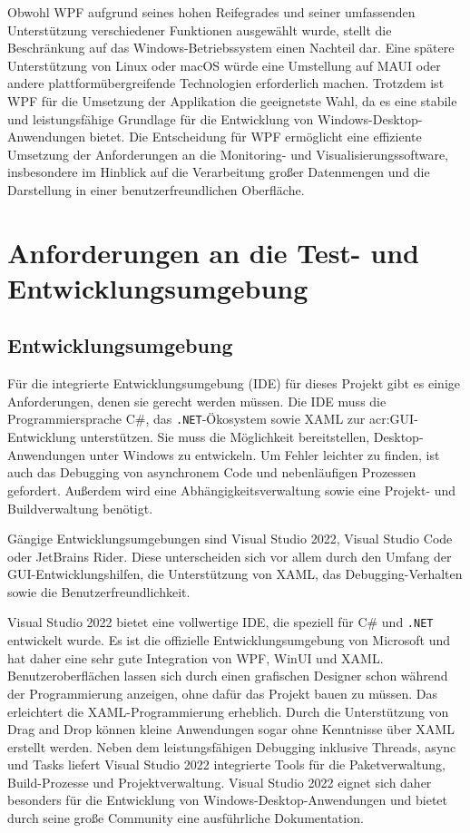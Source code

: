         Obwohl WPF aufgrund seines hohen Reifegrades und seiner umfassenden Unterstützung verschiedener Funktionen ausgewählt wurde, stellt die Beschränkung auf das Windows-Betriebssystem einen Nachteil dar. Eine spätere Unterstützung von Linux oder macOS würde eine Umstellung auf MAUI oder andere plattformübergreifende Technologien erforderlich machen. Trotzdem ist WPF für die Umsetzung der Applikation die geeignetste Wahl, da es eine stabile und leistungsfähige Grundlage für die Entwicklung von Windows-Desktop-Anwendungen bietet. Die Entscheidung für WPF ermöglicht eine effiziente Umsetzung der Anforderungen an die Monitoring- und Visualisierungssoftware, insbesondere im Hinblick auf die Verarbeitung großer Datenmengen und die Darstellung in einer benutzerfreundlichen Oberfläche.
        
\section{Anforderungen an die Test- und Entwicklungsumgebung}
    \subsection{Entwicklungsumgebung}
        Für die integrierte Entwicklungsumgebung (IDE) für dieses Projekt gibt es einige Anforderungen, denen sie gerecht werden müssen. 
        Die IDE muss die Programmiersprache C\#, das \texttt{.NET}-Ökosystem sowie XAML zur \acrshort{acr:GUI}-Entwicklung unterstützen.
        Sie muss die Möglichkeit bereitstellen, Desktop-Anwendungen unter Windows zu entwickeln. 
        Um Fehler leichter zu finden, ist auch das Debugging von asynchronem Code und nebenläufigen Prozessen gefordert.
        Außerdem wird eine Abhängigkeitsverwaltung sowie eine Projekt- und Buildverwaltung benötigt.
        
        Gängige Entwicklungsumgebungen sind Visual Studio 2022, Visual Studio Code oder JetBrains Rider. Diese unterscheiden sich vor allem durch den Umfang der GUI-Entwicklungshilfen, die Unterstützung von XAML, das Debugging-Verhalten sowie die Benutzerfreundlichkeit. \autocite{mikejo5000WasIstVisual} \autocite{RiderCrossplatformNET} \autocite{Working}

        Visual Studio 2022 bietet eine vollwertige IDE, die speziell für C\# und \texttt{.NET} entwickelt wurde. 
        Es ist die offizielle Entwicklungsumgebung von Microsoft und hat daher eine sehr gute Integration von WPF, WinUI und XAML. 
        Benutzeroberflächen lassen sich durch einen grafischen Designer schon während der Programmierung anzeigen, ohne dafür das Projekt bauen zu müssen.
        Das erleichtert die XAML-Programmierung erheblich. Durch die Unterstützung von Drag and Drop 
        können kleine Anwendungen sogar ohne Kenntnisse über XAML erstellt werden. Neben dem leistungsfähigen Debugging inklusive Threads, async und Tasks liefert Visual 
        Studio 2022 integrierte Tools für die Paketverwaltung, Build-Prozesse und Projektverwaltung. 
        Visual Studio 2022 eignet sich daher besonders für die Entwicklung von Windows-Desktop-Anwendungen und bietet durch seine große Community 
        eine ausführliche Dokumentation. \autocite{mikejo5000WasIstVisual}

